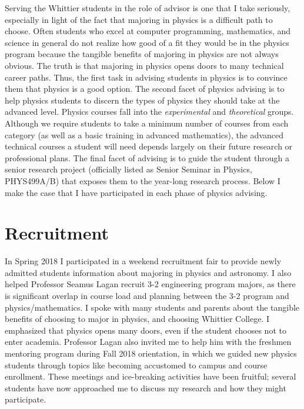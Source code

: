 \documentclass[../main.tex]{subfiles}
\begin{document}
Serving the Whittier students in the role of advisor is one that I take seriously, especially in light of the fact that majoring in physics is a difficult path to choose.  Often students who excel at computer programming, mathematics, and science in general do not realize how good of a fit they would be in the physics program because the tangible benefits of majoring in physics are not always obvious.  The truth is that majoring in physics opens doors to many technical career paths.  Thus, the first task in advising students in physics is to convince them that physics is a good option.  The second facet of physics advising is to help physics students to discern the types of physics they should take at the advanced level.  Physics courses fall into the \textit{experimental} and \textit{theoretical} groups.  Although we require students to take a minimum number of courses from each category (as well as a basic training in advanced mathematics), the advanced technical courses a student will need depends largely on their future research or professional plans.  The final facet of advising is to guide the student through a senior research project (officially listed as Senior Seminar in Physics, PHYS499A/B) that exposes them to the year-long research process.  Below I make the case that I have participated in each phase of physics advising. \\ \hspace{0.1cm}

\section{Recruitment}

In Spring 2018 I participated in a weekend recruitment fair to provide newly admitted students information about majoring in physics and astronomy.  I also helped Professor Seamus Lagan recruit 3-2 engineering program majors, as there is significant overlap in course load and planning between the 3-2 program and physics/mathematics.  I spoke with many students and parents about the tangible benefits of choosing to major in physics, and choosing Whittier College.  I emphasized that physics opens many doors, even if the student chooses not to enter academia.  Professor Lagan also invited me to help him with the freshmen mentoring program during Fall 2018 orientation, in which we guided new physics students through topics like becoming accustomed to campus and course enrollment.  These meetings and ice-breaking activities have been fruitful; several students have now approached me to discuss my research and how they might participate. \\ \hspace{0.1cm}
\end{document}
